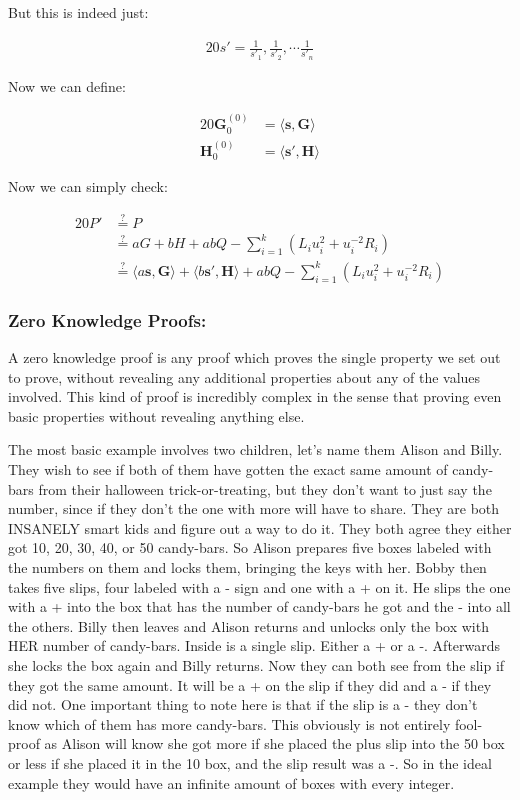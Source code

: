 \documentclass{article}
\newcommand{\eq}[1]{\begin{alignat*}{20}#1\end{alignat*}}
\renewcommand{\vec}[1]{\boldsymbol{#1}}
\newcommand{\dotp}[2]{\langle #1, #2 \rangle}
\begin{document}
But this is indeed just:

\eq{
	s' = \frac{1}{s'_1}, \frac{1}{s'_2}, \cdots \frac{1}{s'_n}
}

Now we can define:

\eq{
	\vec{G}^{(0)}_0 &= \dotp{\vec{s}}{\vec{G}} \\
	\vec{H}^{(0)}_0 &= \dotp{\vec{s'}}{\vec{H}}
}

Now we can simply check:

\eq{
	P' &\stackrel{?}{=} P \\
	   &\stackrel{?}{=} aG + bH + abQ - \sum^k_{i=1} (L_i u^2_i + u^{-2}_i R_i) \\
	   &\stackrel{?}{=} \dotp{a\vec{s}}{\vec{G}} + \dotp{b\vec{s'}}{\vec{H}} + abQ - \sum^k_{i=1} (L_i u^2_i + u^{-2}_i R_i)
}

\subsubsection{Zero Knowledge Proofs:}\label{zero-knowledge}

A zero knowledge proof is any proof which proves the single property we set out to prove, without revealing any additional properties about any of the values involved. This kind of proof is incredibly complex in the sense that proving even basic properties without revealing anything else. 

The most basic example involves two children, let's name them Alison and Billy. They wish to see if both of them have gotten the exact same amount of candy-bars from their halloween trick-or-treating, but they don't want to just say the number, since if they don't the one with more will have to share. They are both INSANELY smart kids and figure out a way to do it. They both agree they either got 10, 20, 30, 40, or 50 candy-bars. So Alison prepares five boxes labeled with the numbers on them and locks them, bringing the keys with her. Bobby then takes five slips, four labeled with a - sign and one with a + on it. He slips the one with a + into the box that has the number of candy-bars he got and the - into all the others. Billy then leaves and Alison returns and unlocks only the box with HER number of candy-bars. Inside is a single slip. Either a + or a -. Afterwards she locks the box again and Billy returns. Now they can both see from the slip if they got the same amount. It will be a + on the slip if they did and a - if they did not. One important thing to note here is that if the slip is a - they don't know which of them has more candy-bars. This obviously is not entirely fool-proof as Alison will know she got more if she placed the plus slip into the 50 box or less if she placed it in the 10 box, and the slip result was a -. So in the ideal example they would have an infinite amount of boxes with every integer. 
\end{document}

